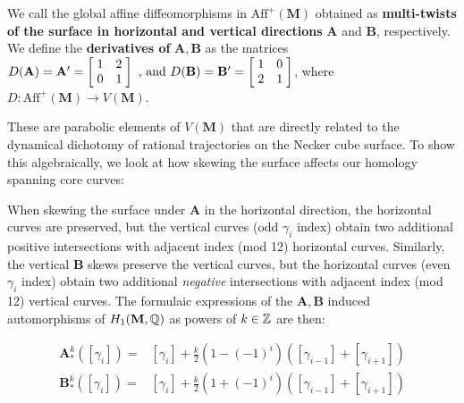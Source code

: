 \documentclass[]{article}
\def\bM{\mathbf{M}}
\begin{document}
\begin{Def}
We call the global affine diffeomorphisms in $\text{Aff}^+(\bM)$ obtained as \textbf{multi-twists of the surface in horizontal and vertical directions} $\mathbf{A}$ and $\mathbf{B}$, respectively.
\\We define the \textbf{derivatives of} $\mathbf{A},\mathbf{B}$ as the matrices 
$D(\mathbf{A})=\mathbf{A}'=\left[ \hspace{1mm} \begin{matrix}
				1 &   2\\
				0 & 1
			\end{matrix}\hspace{1mm}\right] \text{ , and }
			D(\mathbf{B})=\mathbf{B}'=\left[ \hspace{1mm} \begin{matrix}
							1 & 0\\
							 2 & 1
						\end{matrix}\hspace{1mm}\right]$, where $D:\text{Aff}^+(\bM)\rightarrow V(\bM)$.
\end{Def}
These are parabolic elements of $V(\bM)$ that are directly related to the dynamical dichotomy of rational trajectories on the Necker cube surface. To show this algebraically, we look at how skewing the surface affects our homology spanning core curves:

\begin{figure}[H]
\centering

\end{figure}

When skewing the surface under $\mathbf{A}$ in the horizontal direction, the horizontal curves are preserved, but the vertical curves (odd $\gamma_i$ index) obtain two additional positive intersections with adjacent index (mod 12) horizontal curves. Similarly, the vertical $\mathbf{B}$ skews preserve the vertical curves, but the horizontal curves (even $\gamma_i$ index) obtain two additional \emph{negative} intersections with adjacent index (mod 12) vertical curves. The formulaic expressions of the $\mathbf{A}, \mathbf{B}$ induced automorphisms of $H_1(\bM,\QQ)$ as powers of $k\in\mathbb{Z}$ are then:

\begin{align*}
\mathbf{A}^k_*([\gamma_i])=&[\gamma_i] + \frac{k}{2}(1-(-1)^i)([\gamma_{i-1}]+[\gamma_{i+1}])\\
\mathbf{B}^k_*([\gamma_i])=&[\gamma_i] + \frac{k}{2}(1+(-1)^i)([\gamma_{i-1}]+[\gamma_{i+1}])\\
\end{align*}
\end{document}
